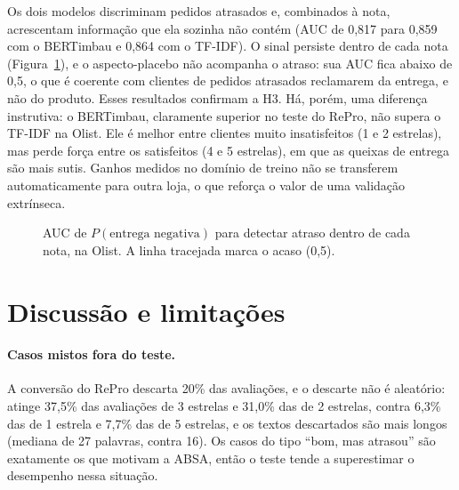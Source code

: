 \documentclass[a4paper, twocolumn, 11pt, twoside]{article}
\begin{document}
Os dois modelos discriminam pedidos atrasados e, combinados à nota, acrescentam informação que ela sozinha não contém (AUC de 0,817 para 0,859 com o BERTimbau e 0,864 com o TF-IDF). O sinal persiste dentro de cada nota (Figura~\ref{fig:pornota}), e o aspecto-placebo não acompanha o atraso: sua AUC fica abaixo de 0,5, o que é coerente com clientes de pedidos atrasados reclamarem da entrega, e não do produto. Esses resultados confirmam a H3. Há, porém, uma diferença instrutiva: o BERTimbau, claramente superior no teste do RePro, não supera o TF-IDF na Olist. Ele é melhor entre clientes muito insatisfeitos (1 e 2 estrelas), mas perde força entre os satisfeitos (4 e 5 estrelas), em que as queixas de entrega são mais sutis. Ganhos medidos no domínio de treino não se transferem automaticamente para outra loja, o que reforça o valor de uma validação extrínseca.

\begin{figure}[htb]
\centering
{}
\caption{AUC de $P(\text{entrega negativa})$ para detectar atraso dentro de cada nota, na Olist. A linha tracejada marca o acaso (0,5).}
\label{fig:pornota}
\end{figure}

\section{Discussão e limitações}

\paragraph{Casos mistos fora do teste.} A conversão do RePro descarta 20\% das avaliações, e o descarte não é aleatório: atinge 37,5\% das avaliações de 3 estrelas e 31,0\% das de 2 estrelas, contra 6,3\% das de 1 estrela e 7,7\% das de 5 estrelas, e os textos descartados são mais longos (mediana de 27 palavras, contra 16). Os casos do tipo ``bom, mas atrasou'' são exatamente os que motivam a ABSA, então o teste tende a superestimar o desempenho nessa situação.
\end{document}
